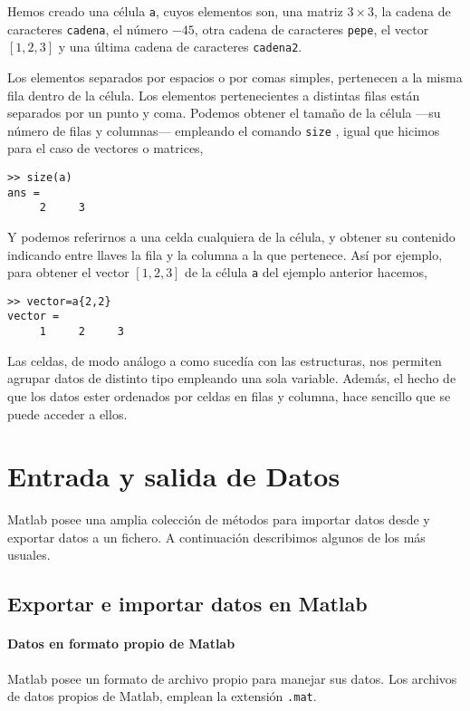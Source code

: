 Hemos creado una célula \texttt{a}, cuyos elementos son, una matriz $3\times 3$, la cadena de caracteres \texttt{cadena}, el número $-45$, otra cadena de caracteres \texttt{pepe}, el vector $[1,2,3]$ y una última cadena de caracteres \texttt{cadena2}.

Los elementos separados por espacios o por comas simples, pertenecen a la misma fila dentro de la célula. Los elementos pertenecientes a distintas filas están separados por un punto y coma.  Podemos obtener el tamaño de la célula ---su número de filas y columnas--- empleando el comando \texttt{size} , igual que hicimos para el caso de vectores o matrices,

\begin{verbatim}
>> size(a)
ans =
     2     3
\end{verbatim}

Y podemos referirnos a una celda cualquiera de la célula, y obtener su contenido indicando entre llaves la fila y la columna a la que pertenece. Así por ejemplo, para obtener el vector $[1,2,3]$ de la célula \texttt{a} del ejemplo anterior hacemos,
\begin{verbatim}
>> vector=a{2,2}
vector =
     1     2     3
\end{verbatim}

Las celdas, de modo análogo a como sucedía con las estructuras, nos permiten agrupar datos de distinto tipo empleando una sola variable. Además, el hecho de que los datos ester ordenados por celdas en filas y columna, hace sencillo que se puede acceder a ellos.
 
\section{Entrada y salida de Datos}
Matlab posee una amplia colección de métodos para importar datos desde y exportar datos a un fichero. A continuación describimos algunos de los más usuales.

\subsection{Exportar e importar datos en Matlab} \label{fpf}

\paragraph*{Datos en formato propio de Matlab}
Matlab posee un formato de archivo propio para manejar sus datos. Los archivos de datos propios de Matlab, emplean la extensión \texttt{.mat}.


